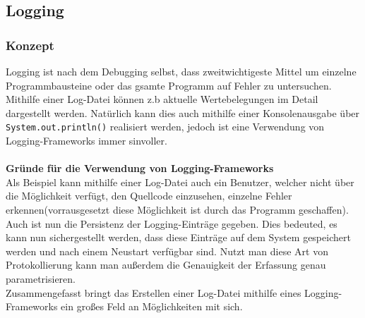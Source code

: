 \subsection{Logging}
\subsubsection{Konzept}\label{sssec:logOverview}
Logging ist nach dem Debugging selbst, dass zweitwichtigeste Mittel um einzelne Programmbausteine oder das gsamte Programm auf Fehler zu untersuchen.
Mithilfe einer Log-Datei können z.b aktuelle Wertebelegungen im Detail dargestellt werden.
Natürlich kann dies auch mithilfe einer Konsolenausgabe über \lstinline[style=java]{System.out.println()} realisiert werden, jedoch ist eine Verwendung von Logging-Frameworks immer sinvoller.\\\\
\textbf{Gründe für die Verwendung von Logging-Frameworks}\\
Als Beispiel kann mithilfe einer Log-Datei auch ein Benutzer, welcher nicht über die Möglichkeit verfügt, den Quellcode einzusehen, einzelne Fehler erkennen(vorrausgesetzt diese Möglichkeit ist durch das Programm geschaffen).
Auch ist nun die Persistenz der Logging-Einträge gegeben.
Dies bedeuted, es kann nun sichergestellt werden, dass diese Einträge auf dem System gespeichert werden und nach einem Neustart verfügbar sind.
Nutzt man diese Art von Protokollierung kann man außerdem die Genauigkeit der Erfassung genau parametrisieren.\\
Zusammengefasst bringt das Erstellen einer Log-Datei mithilfe eines Logging-Frameworks ein großes Feld an Möglichkeiten mit sich.\\\\

